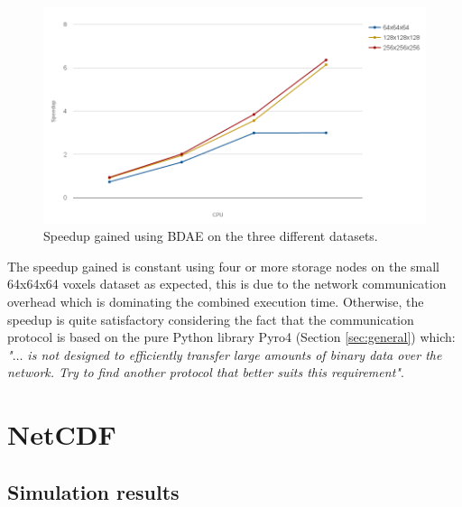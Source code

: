 \begin{figure}[h!]
	\centering
	\includegraphics[scale=0.4]{img/fdk-speedup.png}
	\caption[]{Speedup gained using BDAE on the three different datasets. \label{fig:fdk-speedup}}
\end{figure}

The speedup gained is constant using four or more storage nodes on the small 64x64x64 voxels dataset as expected, this is due to the network communication overhead which is dominating the combined execution time. Otherwise, the speedup is quite satisfactory considering the fact that the communication protocol is based on the pure Python library Pyro4 (Section \ref{sec:general}) which: \textit{"$\ldots$ is not designed to efficiently transfer large amounts of binary data over the network. Try to find another protocol that better suits this requirement"}\cite{PagePyro4}.

\section{NetCDF}

\subsection*{Simulation results}

